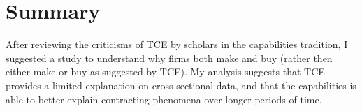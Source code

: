 \documentclass[12pt,letterpaper]{article}
\begin{document}
\section{Summary}
After reviewing the criticisms of TCE by scholars in the capabilities tradition, I suggested a study to understand why firms both make and buy (rather then either make or buy as suggested by TCE). My analysis suggests that TCE provides a limited explanation on cross-sectional data, and that the capabilities is able to better explain contracting phenomena over longer periods of time.



\begin{singlespace}
\renewcommand{\refname}{REFERENCES}
 

\end{singlespace}
\end{document}
